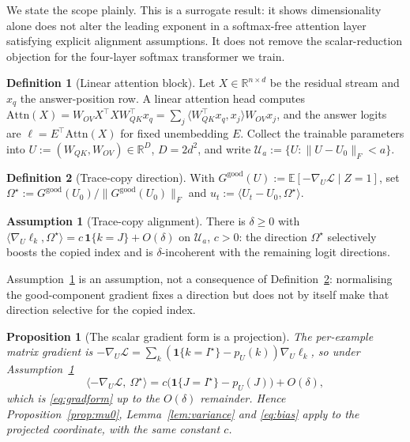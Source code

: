 \documentclass{article}
\theoremstyle{plain}
\newtheorem{proposition}{Proposition}
\theoremstyle{definition}
\newtheorem{definition}{Definition}
\newtheorem{assumption}{Assumption}
\theoremstyle{remark}
\newcommand{\E}{\mathbb{E}}
\newcommand{\R}{\mathbb{R}}
\newcommand{\1}{\mathbf{1}}
\newcommand{\cL}{\mathcal{L}}
\newcommand{\cU}{\mathcal{U}}
\newcommand{\good}{\mathrm{good}}
\newcommand{\Om}{\Omega}
\begin{document}
We state the scope plainly. This is a surrogate result: it shows dimensionality
alone does not alter the leading exponent in a softmax-free attention layer
satisfying explicit alignment assumptions. It does not remove the
scalar-reduction objection for the four-layer softmax transformer we train.

\begin{definition}[Linear attention block]
\label{def:linattn}
Let $X\in\R^{n\times d}$ be the residual stream and $x_q$ the answer-position
row. A linear attention head computes
$\mathrm{Attn}(X) = W_{OV}X^\top XW_{QK}^\top x_q
= \sum_j\langle W_{QK}^\top x_q, x_j\rangle W_{OV}x_j$, and the answer logits are
$\ell = E^\top\mathrm{Attn}(X)$ for fixed unembedding $E$. Collect the trainable
parameters into $U := (W_{QK},W_{OV})\in\R^D$, $D = 2d^2$, and write
$\cU_a := \{U : \|U-U_0\|_F < a\}$.
\end{definition}

\begin{definition}[Trace-copy direction]
\label{def:tracedir}
With $G^\good(U) := \E[-\nabla_U\cL\mid Z=1]$, set
$\Om^\star := G^\good(U_0)/\|G^\good(U_0)\|_F$ and
$u_t := \langle U_t - U_0,\Om^\star\rangle$.
\end{definition}

\begin{assumption}[Trace-copy alignment]
\label{ass:alignment}
There is $\delta\ge0$ with
$\langle\nabla_U\ell_k,\Om^\star\rangle = c\,\1\{k = J\}+O(\delta)$ on $\cU_a$,
$c>0$: the direction $\Om^\star$ selectively boosts the copied index and is
$\delta$-incoherent with the remaining logit directions.
\end{assumption}

Assumption~\ref{ass:alignment} is an assumption, not a consequence of
Definition~\ref{def:tracedir}: normalising the good-component gradient fixes a
direction but does not by itself make that direction selective for the copied
index.

\begin{proposition}[The scalar gradient form is a projection]
\label{prop:projection}
The per-example matrix gradient is
$-\nabla_U\cL = \sum_k(\1\{k=I^\star\}-p_U(k))\nabla_U\ell_k$, so under
Assumption~\ref{ass:alignment}
\begin{equation}
\label{eq:matproj}
\langle-\nabla_U\cL,\ \Om^\star\rangle
= c\big(\1\{J=I^\star\}-p_U(J)\big) + O(\delta),
\end{equation}
which is \eqref{eq:gradform} up to the $O(\delta)$ remainder. Hence
Proposition~\ref{prop:mu0}, Lemma~\ref{lem:variance} and \eqref{eq:bias} apply to
the projected coordinate, with the same constant $c$.
\end{proposition}
\end{document}
